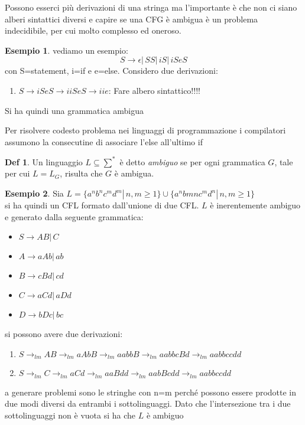 \documentclass[a4paper]{book}
\theoremstyle{definition}%
\newtheorem*{defi}{Def}%
\newtheorem*{esempio}{Esempio}
\begin{document}
Possono esserci più derivazioni di una stringa ma l'importante è che non ci siano alberi sintattici diversi e capire se una CFG è ambigua
è un problema indecidibile, per cui molto complesso ed oneroso.
\begin{esempio}
vediamo un esempio:
\[ S\to \epsilon|\,SS|\, iS|\, iSeS \]
con S=statement, i=if e e=else.
Considero due derivazioni:
\begin{enumerate}
\item $S\to iSeS\to iiSeS\to iie$:
  Fare albero sintattico!!!!
\end{enumerate}
Si ha quindi una grammatica ambigua
\end{esempio}
Per risolvere codesto problema nei linguaggi di programmazione i compilatori assumono la consecutine di associare l'else all'ultimo if

 \begin{defi}
    Un linguaggio $L \subseteq \sum^*$ è detto \emph{ambiguo} se per ogni grammatica $G$, tale per cui $L = L_G$, risulta che $G$ è ambigua.
  \end{defi}
\begin{esempio}
Sia $L=\{a^nb^nc^md^m|\, n,m\geq 1\}\cup \{a^nbmnc^md^n|\, n,m\geq 1\}$\\
si ha quindi un CFL formato dall'unione di due CFL. $L$ è inerentemente ambiguo e generato dalla seguente grammatica:
\begin{itemize}
\item $S\to AB|\,C$
\item $A\to aAb|\,ab$
\item $B\to cBd|\, cd$
\item $C\to aCd|\, aDd$
\item $D\to bDc|\, bc$
\end{itemize}
si possono avere due derivazioni:
\begin{enumerate}
\item $S\to_{lm}AB\to_{lm} aAbB\to_{lm} aabbB\to_{lm}aabbcBd\to_{lm}aabbccdd$
\item $S\to_{lm} C\to_{lm} aCd\to_{lm}aaBdd\to_{lm}aabBcdd\to_{lm}aabbccdd$
\end{enumerate}
a generare problemi sono le stringhe con n=m perché possono essere prodotte in due modi diversi da entrambi i sottolinguaggi. Dato che l'intersezione tra i due sottolinguaggi non è vuota si ha che $L$ è ambiguo
\end{esempio}
\end{document}
